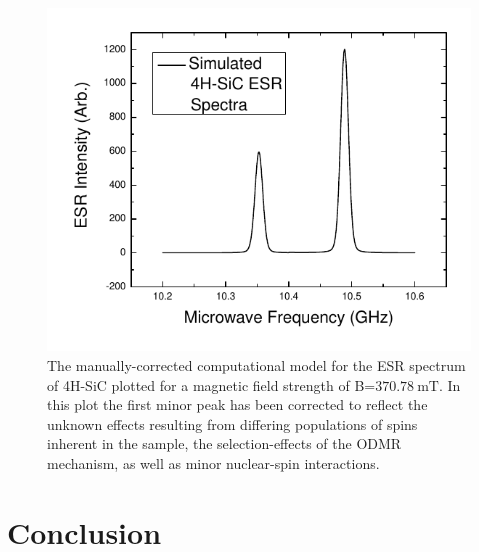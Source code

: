 \documentclass[oneside, noacknowlegments]{BYUPhys}
\begin{document}
\begin{figure}
    \centerline{\includegraphics{p14-esr}}
    \caption[ESR Computational Model for SiC]{\label{fig:SiCModelCorrected}
     The manually-corrected computational model for the ESR spectrum of 4H-SiC plotted for a magnetic field strength of B=$370.78~\text{mT}$. In this plot the first minor peak has been corrected to reflect the unknown effects resulting from differing populations of spins inherent in the sample, the selection-effects of the ODMR mechanism, as well as minor nuclear-spin interactions.}
 \end{figure}

\section{Conclusion}
\end{document}
